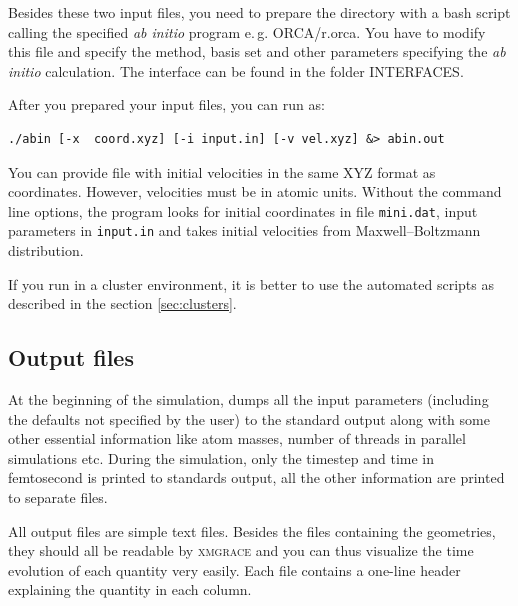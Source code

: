 Besides these two input files, you need to prepare the directory with a bash script calling the specified \textit{ab initio} program e.\,g. ORCA/r.orca. You have to modify this file and specify the method, basis set and other parameters specifying the \textit{ab initio} calculation. The interface can be found in the folder INTERFACES.

After you prepared your input files, you can run \abin as:

\begin{lstlisting}
./abin [-x  coord.xyz] [-i input.in] [-v vel.xyz] &> abin.out  
\end{lstlisting}

You can provide file with initial velocities in the same XYZ format as coordinates. However, velocities must be in atomic units. Without the command line options, the program looks for initial coordinates in file \texttt{mini.dat}, input parameters in \texttt{input.in} and takes initial velocities from Maxwell--Boltzmann distribution.

If you run \abin in a cluster environment, it is better to use the automated scripts as described in the section \ref{sec:clusters}.

\subsection{Output files}

At the beginning of the simulation, \abin dumps all the input parameters (including the defaults not specified by the user)
to the standard output along with some other essential information like atom masses, number of threads in parallel simulations etc.
During the simulation, only the timestep and time in femtosecond is printed to standards output, all the other information are printed to separate files.

All output files are simple text files. Besides the files containing the geometries, they should all be readable by \textsc{xmgrace} and you can thus visualize the time evolution of each quantity very easily. Each file contains a one-line header explaining the quantity in each column.


